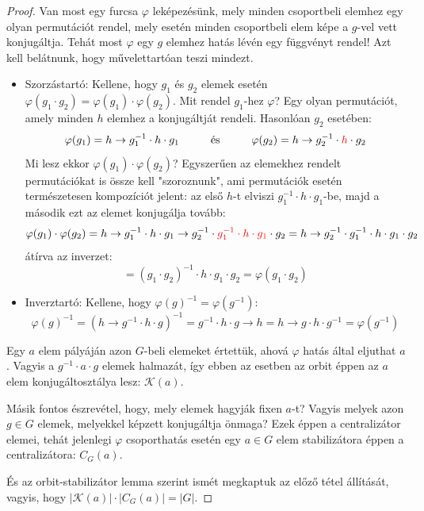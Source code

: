 \documentclass[12pt]{book}
\theoremstyle{plain} %
\theoremstyle{definition} %
\theoremstyle{remark}
\numberwithin{equation}{section}  %
\begin{document}
	\begin{proof}
		Van most egy furcsa $\varphi$ leképezésünk, mely minden csoportbeli elemhez egy olyan permutációt rendel, mely esetén minden csoportbeli elem képe a $g$-vel vett konjugáltja. Tehát most $\varphi$ egy $g$ elemhez hatás lévén egy függvényt rendel! Azt kell belátnunk, hogy művelettartóan teszi mindezt.
		
		\begin{itemize}
			\item Szorzástartó: Kellene, hogy $g_1$ és $g_2$ elemek esetén $\varphi(g_1\cdot g_2) = \varphi(g_1) \cdot \varphi(g_2)$. Mit rendel $g_1$-hez $\varphi$? Egy olyan permutációt, amely minden $h$ elemhez a konjugáltját rendeli. Hasonlóan $g_2$ esetében:
			\[ \varphi(g_1) = h \to g_1^{-1}\cdot h \cdot g_1 \hspace{10mm} \text{és} \hspace{10mm} \varphi(g_2) = h \to g_2^{-1} \cdot \color{red} h \color{black} \cdot g_2  \]
			Mi lesz ekkor $\varphi(g_1)\cdot \varphi(g_2)$? Egyszerűen az elemekhez rendelt permutációkat is össze kell "szoroznunk", ami permutációk esetén természetesen kompozíciót jelent: az első $h$-t elviszi $g_1^{-1}\cdot h\cdot g_1$-be, majd a második ezt az elemet konjugálja tovább:
			\[ \varphi(g_1)\cdot \varphi(g_2) = h\to g_1^{-1} \cdot h \cdot g_1 \to g_2^{-1} \cdot \color{red} g_1^{-1} \cdot h \cdot g_1 \color{black} \cdot g_2 = h \to g_2^{-1} \cdot g_1^{-1} \cdot h \cdot g_1 \cdot g_2 \]
			átírva az inverzet:
			\[ = (g_1\cdot g_2)^{-1} \cdot h \cdot g_1 \cdot g_2 = \varphi(g_1\cdot g_2)  \]
			\item Inverztartó: Kellene, hogy $\varphi(g)^{-1} = \varphi(g^{-1})$:
			\[ \varphi(g)^{-1} = (h\to g^{-1} \cdot h \cdot g)^{-1} = g^{-1} \cdot h \cdot g \to h = h \to g\cdot h \cdot g^{-1}  = \varphi(g^{-1}) \]
		\end{itemize}
		Egy $a$ elem pályáján azon $G$-beli elemeket értettük, ahová $\varphi$ hatás által eljuthat $a$. Vagyis a $g^{-1} \cdot a \cdot g$ elemek halmazát, így ebben az esetben az orbit éppen az $a$ elem konjugáltosztálya lesz: $\mathcal{K}(a)$.
		
		Másik fontos észrevétel, hogy, mely elemek hagyják fixen $a$-t? Vagyis melyek azon $g\in G$ elemek, melyekkel képzett konjugáltja önmaga? Ezek éppen a centralizátor elemei, tehát jelenlegi $\varphi$ csoporthatás esetén egy $a\in G$ elem stabilizátora éppen a centralizátora: $C_G(a)$.
		
		És az orbit-stabilizátor lemma szerint ismét megkaptuk az előző tétel állítását, vagyis, hogy $|\mathcal{K}(a)| \cdot |C_G(a)| = |G|$.
	\end{proof}
	
\end{document}
